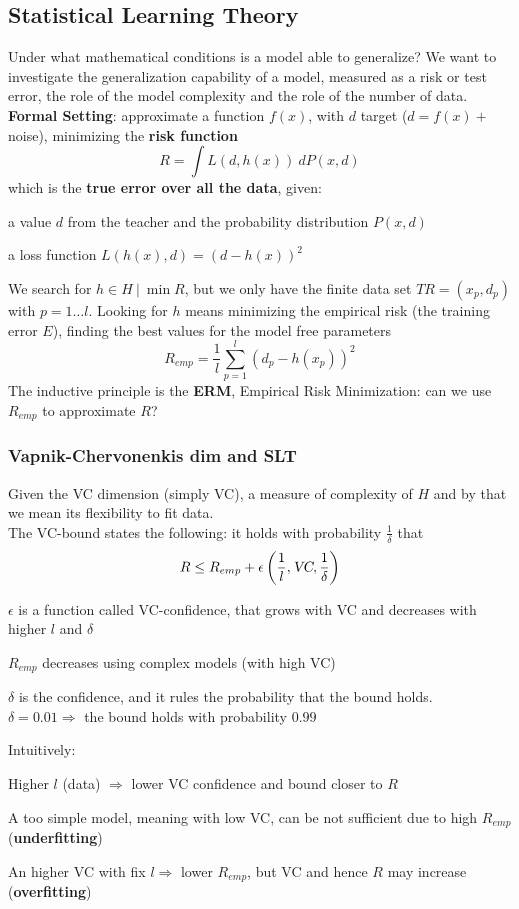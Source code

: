 \documentclass[10pt]{report}
\begin{document}
\subsection{Statistical Learning Theory} Under what mathematical conditions is a model able to generalize? We want to investigate the generalization capability of a model, measured as a risk or test error, the role of the model complexity and the role of the number of data.\\
\textbf{Formal Setting}: approximate a function $f(x)$, with $d$ target ($d = f(x) +$ noise), minimizing the \textbf{risk function} $$R = \int L(d, h(x))\:dP(x,d)$$ which is the \textbf{true error over all the data}, given:
\begin{list}{}{}
	\item a value $d$ from the teacher and the probability distribution $P(x,d)$
	\item a loss function $L(h(x),d) = (d - h(x))^2$
\end{list}
We search for $h\in H\:|\: \min R$, but we only have the finite data set $TR = (x_p, d_p)$ with $p = 1\ldots l$. Looking for $h$ means minimizing the empirical risk (the training error $E$), finding the best values for the model free parameters $$R_{emp} = \frac{1}{l}\sum_{p=1}^l (d_p - h(x_p))^2$$
The inductive principle is the \textbf{ERM}, Empirical Risk Minimization: can we use $R_{emp}$ to approximate $R$?
\subsubsection{Vapnik-Chervonenkis dim and SLT} Given the VC dimension (simply VC), a measure of complexity of $H$ and by that we mean its flexibility to fit data.\\
The VC-bound states the following: it holds with probability $\frac{1}{\delta}$ that $$R \leq R_{emp} + \epsilon\left(\frac{1}{l}, \textsl{VC},\frac{1}{\delta}\right)$$
\begin{list}{}{}
	\item $\epsilon$ is a function called VC-confidence, that grows with VC and decreases with higher $l$ and $\delta$
	\item $R_{emp}$ decreases using complex models (with high VC)
	\item $\delta$ is the confidence, and it rules the probability that the bound holds.\\
	$\delta = 0.01 \Rightarrow$ the bound holds with probability $0.99$
\end{list}
Intuitively:
\begin{list}{}{}
	\item Higher $l$ (data) $\Rightarrow$ lower VC confidence and bound closer to $R$
	\item A too simple model, meaning with low VC, can be not sufficient due to high $R_{emp}$ (\textbf{underfitting})
	\item An higher VC with fix $l \Rightarrow$ lower $R_{emp}$, but VC and hence $R$ may increase (\textbf{overfitting})
\end{list}
\end{document}
